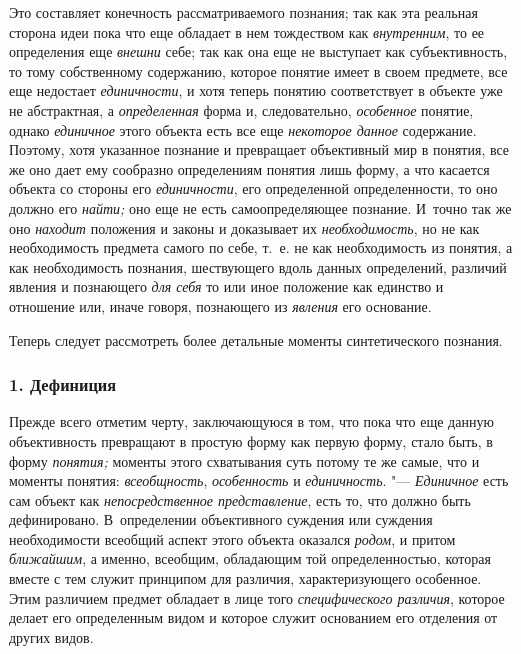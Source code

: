 Это составляет конечность рассматриваемого познания; так как
эта реальная сторона идеи пока что еще обладает в нем тождеством как
{\em внутренним}, то ее
определения еще {\em внешни}
себе; так как она еще не выступает как субъективность, то
тому собственному содержанию, которое понятие имеет в своем предмете, все
еще недостает {\em единичности},
и хотя теперь понятию соответствует в объекте уже не
абстрактная, а {\em определенная}
форма и, следовательно,
{\em особенное} понятие,
однако {\em единичное}
этого объекта есть все еще
{\em некоторое данное}
содержание. Поэтому, хотя указанное познание и превращает
объективный мир в понятия, все же оно дает ему сообразно
определениям понятия лишь форму, а что касается объекта со стороны его
{\em единичности}, его
определенной определенности, то оно должно его
{\em найти;} оно еще не
есть самоопределяющее познание. И~точно так же оно
{\em находит} положения и
законы и доказывает их
{\em необходимость}, но
не как необходимость предмета самого по себе, т.~е. не как необходимость из
понятия, а как необходимость познания, шествующего вдоль данных
определений, различий явления и познающего
{\em для себя} то или
иное положение как единство и отношение или, иначе говоря, познающего из
{\em явления} его
основание.

Теперь следует рассмотреть более детальные моменты синтетического познания.

\subsubsection[1. Дефиниция]{\bfseries 1. Дефиниция}

Прежде всего отметим черту, заключающуюся в том, что пока что
еще данную объективность превращают в простую форму как первую форму, стало
быть, в форму {\em понятия;}
моменты этого схватывания суть потому те же самые, что и
моменты понятия: {\em всеобщность},
{\em особенность} и
{\em единичность}. "---
{\em Единичное} есть сам
объект как {\em непосредственное
представление}, есть то, что должно быть дефинировано.
В~определении объективного суждения или суждения необходимости всеобщий
аспект этого объекта оказался
{\em родом}, и притом
{\em ближайшим}, а
именно, всеобщим, обладающим той определенностью, которая вместе с тем
служит принципом для различия, характеризующего особенное. Этим различием
предмет обладает в лице того
{\em специфического различия},
которое делает его определенным видом и которое служит
основанием его отделения от других видов.

